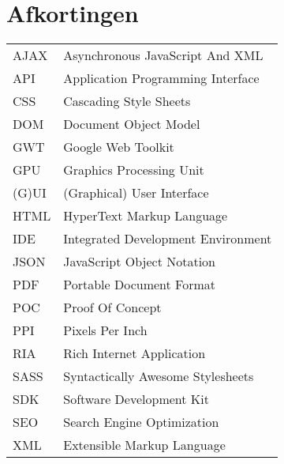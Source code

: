 \documentclass[master=cws,dutch]{kulemt}
\begin{document}
\section*{Afkortingen}
\begin{flushleft}
  \renewcommand{\arraystretch}{1.1}
  \begin{tabularx}{\textwidth}{@{}p{12mm}X@{}}
     AJAX & Asynchronous JavaScript And XML \\
     API & Application Programming Interface \\
     CSS & Cascading Style Sheets \\
     DOM & Document Object Model \\
     GWT & Google Web Toolkit \\
     GPU & Graphics Processing Unit \\
     (G)UI & (Graphical) User Interface \\
     HTML & HyperText Markup Language \\
     IDE & Integrated Development Environment \\
     JSON & JavaScript Object Notation \\
     PDF & Portable Document Format \\
     POC & Proof Of Concept \\
     PPI & Pixels Per Inch \\
     RIA & Rich Internet Application \\
     SASS & Syntactically Awesome Stylesheets \\
     SDK & Software Development Kit \\
     SEO & Search Engine Optimization \\
     XML & Extensible Markup Language
  \end{tabularx}
\end{flushleft}
\end{document}
